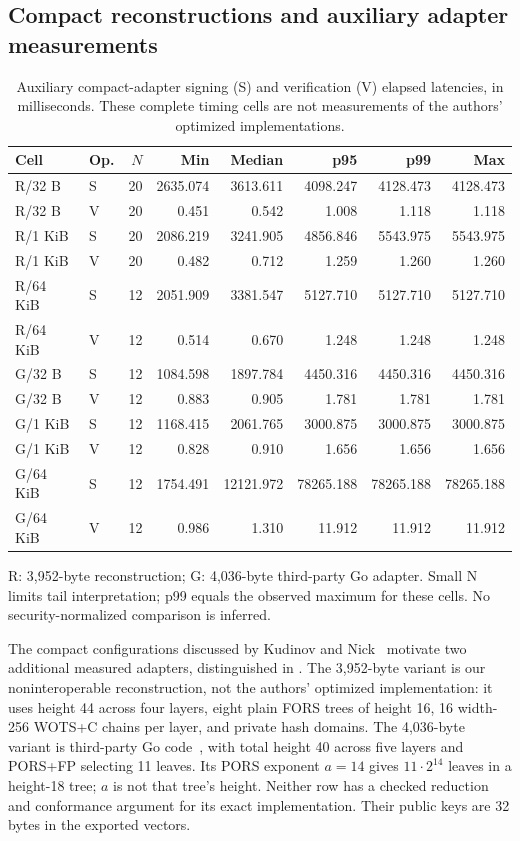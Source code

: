 \subsection{Compact reconstructions and auxiliary adapter measurements}
\begin{table}[t]
\caption{Auxiliary compact-adapter signing (S) and verification (V) elapsed latencies, in milliseconds. These complete timing cells are not measurements of the authors' optimized implementations.}\label{tab:comparison-kn}
\centering\small\setlength{\tabcolsep}{3pt}
\begin{tabular}{llrrrrrr}\toprule
Cell & Op. & $N$ & Min & Median & p95 & p99 & Max\\\midrule
R/32 B & S & 20 & 2635.074 & 3613.611 & 4098.247 & 4128.473 & 4128.473\\
R/32 B & V & 20 & 0.451 & 0.542 & 1.008 & 1.118 & 1.118\\
R/1 KiB & S & 20 & 2086.219 & 3241.905 & 4856.846 & 5543.975 & 5543.975\\
R/1 KiB & V & 20 & 0.482 & 0.712 & 1.259 & 1.260 & 1.260\\
R/64 KiB & S & 12 & 2051.909 & 3381.547 & 5127.710 & 5127.710 & 5127.710\\
R/64 KiB & V & 12 & 0.514 & 0.670 & 1.248 & 1.248 & 1.248\\
G/32 B & S & 12 & 1084.598 & 1897.784 & 4450.316 & 4450.316 & 4450.316\\
G/32 B & V & 12 & 0.883 & 0.905 & 1.781 & 1.781 & 1.781\\
G/1 KiB & S & 12 & 1168.415 & 2061.765 & 3000.875 & 3000.875 & 3000.875\\
G/1 KiB & V & 12 & 0.828 & 0.910 & 1.656 & 1.656 & 1.656\\
G/64 KiB & S & 12 & 1754.491 & 12121.972 & 78265.188 & 78265.188 & 78265.188\\
G/64 KiB & V & 12 & 0.986 & 1.310 & 11.912 & 11.912 & 11.912\\
\bottomrule\end{tabular}
\smallskip\par\raggedright\footnotesize R: 3,952-byte reconstruction; G: 4,036-byte third-party Go adapter. Small N limits tail interpretation; p99 equals the observed maximum for these cells. No security-normalized comparison is inferred.
\end{table}
The compact configurations discussed by Kudinov and Nick~\cite{kn} motivate two additional measured adapters, distinguished in . The 3,952-byte variant is our noninteroperable reconstruction, not the authors' optimized implementation: it uses height 44 across four layers, eight plain FORS trees of height 16, 16 width-256 WOTS+C chains per layer, and private hash domains. The 4,036-byte variant is third-party Go code~\cite{hashsiggo}, with total height 40 across five layers and PORS+FP selecting 11 leaves. Its PORS exponent $a=14$ gives $11\cdot2^{14}$ leaves in a height-18 tree; $a$ is not that tree's height. Neither row has a checked reduction and conformance argument for its exact implementation. Their public keys are 32 bytes in the exported vectors.

